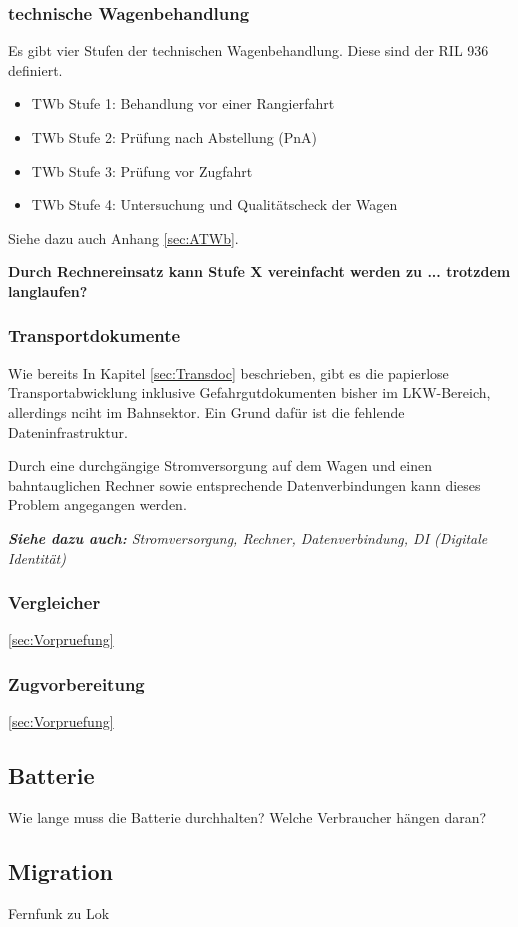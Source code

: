 \subsubsection{technische Wagenbehandlung}
Es gibt vier Stufen der technischen Wagenbehandlung. Diese sind der RIL 936 definiert.
\begin{itemize}
    \item TWb Stufe 1: Behandlung vor einer Rangierfahrt
    \item TWb Stufe 2: Prüfung nach Abstellung (PnA)
    \item TWb Stufe 3: Prüfung vor Zugfahrt
    \item TWb Stufe 4: Untersuchung und Qualitätscheck der Wagen
\end{itemize}
Siehe dazu auch Anhang \ref{sec:ATWb}.\par
\textbf{Durch Rechnereinsatz kann Stufe X vereinfacht werden zu ... trotzdem langlaufen?}
\subsubsection{Transportdokumente}
Wie bereits In Kapitel \ref{sec:Transdoc} beschrieben, gibt es die papierlose Transportabwicklung inklusive Gefahrgutdokumenten bisher im LKW-Bereich, allerdings nciht im Bahnsektor. Ein Grund dafür ist die fehlende Dateninfrastruktur.\par
Durch eine durchgängige Stromversorgung auf dem Wagen und einen bahntauglichen Rechner sowie entsprechende Datenverbindungen kann dieses Problem angegangen werden.\par
\textit{\textbf{Siehe dazu auch:} Stromversorgung, Rechner, Datenverbindung, DI (Digitale Identität)}
\subsubsection{Vergleicher}
\ref{sec:Vorpruefung}
\subsubsection{Zugvorbereitung}
\ref{sec:Vorpruefung}
\subsection{Batterie}
Wie lange muss die Batterie durchhalten? Welche Verbraucher hängen daran?
\subsection{Migration}
Fernfunk zu Lok